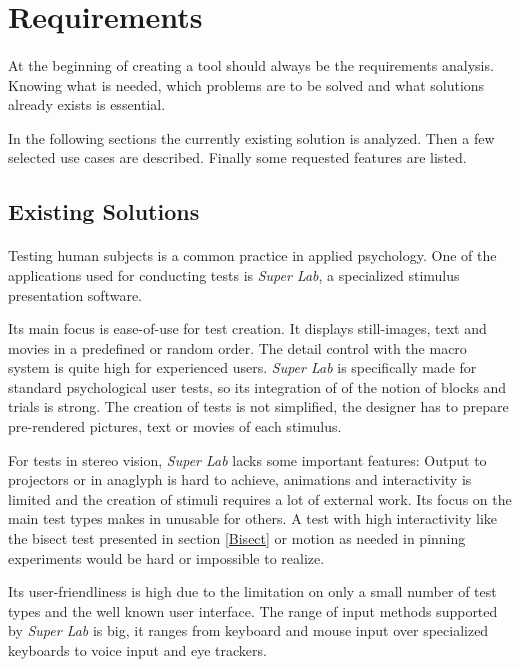\section{Requirements\label{Requirements}}
\paragraph{}
At the beginning of creating a tool should always be the requirements analysis.
Knowing what is needed, which problems are to be solved and what solutions already exists is essential.

In the following sections the currently existing solution is analyzed.
Then a few selected use cases are described.
Finally some requested features are listed.

\subsection{Existing Solutions}
\paragraph{}
Testing human subjects is a common practice in applied psychology.
One of the applications used for conducting tests is \textit{Super Lab}\cite{superlab}, a specialized stimulus presentation software.

Its main focus is ease-of-use for test creation.
It displays still-images, text and movies in a predefined or random order.
The detail control with the macro system is quite high for experienced users.
\textit{Super Lab} is specifically made for standard psychological user tests, so its integration of of the notion of blocks and trials is strong.
The creation of tests is not simplified, the designer has to prepare pre-rendered pictures, text or movies of each stimulus.

For tests in stereo vision, \textit{Super Lab} lacks some important features:
Output to projectors or in anaglyph is hard to achieve, animations and interactivity is limited and the creation of stimuli requires a lot of external work.
Its focus on the main test types makes in unusable for others.
A test with high interactivity like the bisect test presented in section \ref{Bisect} or motion as needed in pinning experiments would be hard or impossible to realize.

Its user-friendliness is high due to the limitation on only a small number of test types and the well known user interface.
The range of input methods supported by \textit{Super Lab} is big, it ranges from keyboard and mouse input over specialized keyboards to voice input and eye trackers.


